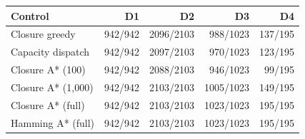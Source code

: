 \begin{tabular}{lrrrr}\toprule
Control & D1 & D2 & D3 & D4\\\midrule
Closure greedy & 942/942 & 2096/2103 & 988/1023 & 137/195\\
Capacity dispatch & 942/942 & 2097/2103 & 970/1023 & 123/195\\
Closure A* (100) & 942/942 & 2088/2103 & 946/1023 & 99/195\\
Closure A* (1,000) & 942/942 & 2103/2103 & 1005/1023 & 149/195\\
Closure A* (full) & 942/942 & 2103/2103 & 1023/1023 & 195/195\\
Hamming A* (full) & 942/942 & 2103/2103 & 1023/1023 & 195/195\\
\bottomrule\end{tabular}
